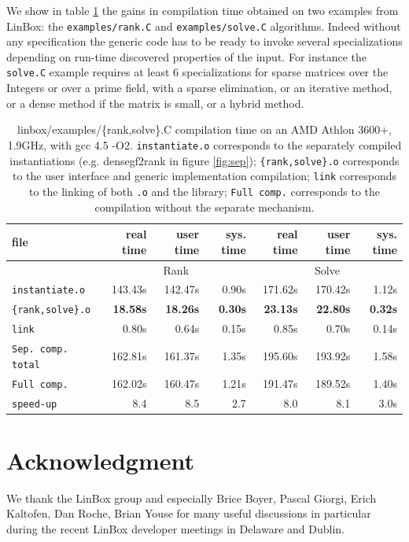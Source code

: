 \documentclass[runningheads,a4paper]{llncs}
\newcommand{\linbox}{{\sc LinBox}\xspace}
\begin{document}
We show in table \ref{tab:compilation} the gains in compilation time
obtained on two examples from \linbox: the \texttt{examples/rank.C} and
\texttt{examples/solve.C} algorithms. Indeed without any specification
the generic code
has to be ready to invoke several specializations depending on
run-time discovered properties of the input. For instance the
\texttt{solve.C} example requires at least 6 specializations for sparse
matrices over the Integers or over a prime field, with a sparse
elimination, or an iterative method, or a dense method if the matrix
is small, or a hybrid method.
\begin{table}[ht]\center
\begin{tabular}{|l||r|r|r||r|r|r|}
\hline
file                      &  real time   &  user time   &  sys. time  &  real time   &  user time   &  sys. time \\
\hline
 & \multicolumn{3}{|c||}{Rank}& \multicolumn{3}{|c|}{Solve}\\
\hline
\texttt{instantiate.o} & 143.43s & 142.47s & 0.90s & 171.62s & 170.42s & 1.12s\\
\texttt{\{rank,solve\}.o} & \bf 18.58s & \bf 18.26s & \bf 0.30s & \bf 23.13s & \bf 22.80s & \bf 0.32s\\
\texttt{link} & 0.80s & 0.64s & 0.15s & 0.85s & 0.70s & 0.14s\\
\hline
\texttt{Sep. comp. total} & 162.81s & 161.37s & 1.35s & 195.60s & 193.92s & 1.58s\\
\hline
\texttt{Full comp.} & 162.02s & 160.47s & 1.21s & 191.47s & 189.52s & 1.40s\\
\hline
\hline
\texttt{speed-up} & 8.4 & 8.5 & 2.7 & 8.0 & 8.1 & 3.0s\\
\hline
\end{tabular} 
\caption{linbox/examples/\{rank,solve\}.C compilation time on an AMD
  Athlon 3600+, 1.9GHz, with gcc 4.5 -O2. \texttt{instantiate.o} corresponds to the separately compiled
  instantiations (e.g. densegf2rank in figure \ref{fig:sep});
  \texttt{\{rank,solve\}.o} corresponds to the user interface and generic
  implementation compilation; \texttt{link} corresponds to the
  linking of both \texttt{.o} and the library; \texttt{Full comp.}
  corresponds to the compilation without the separate
  mechanism.}\label{tab:compilation}
\end{table}

\section*{Acknowledgment}
We thank the \linbox group and especially Brice Boyer, Pascal Giorgi,
Erich Kaltofen, Dan Roche, Brian Youse for many useful discussions 
in particular during the recent \linbox developer meetings in
Delaware and Dublin.


 
\end{document}
